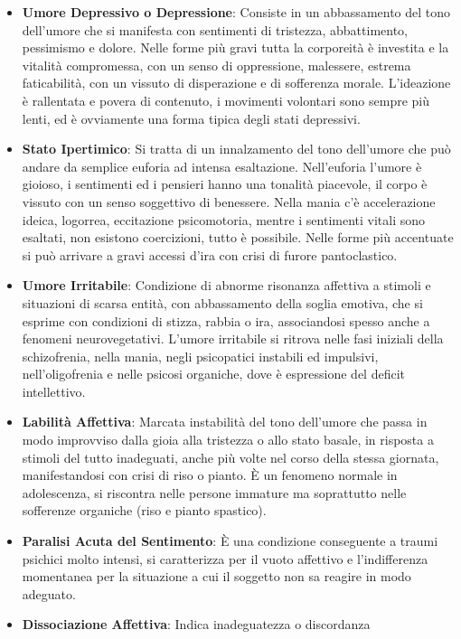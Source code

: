 \begin{itemize}
\item
  \textbf{Umore Depressivo o Depressione}: Consiste in un abbassamento
  del tono dell'umore che si manifesta con sentimenti di tristezza,
  abbattimento, pessimismo e dolore. Nelle forme più gravi tutta la
  corporeità è investita e la vitalità compromessa, con un senso di
  oppressione, malessere, estrema faticabilità, con un vissuto di
  disperazione e di sofferenza morale. L'ideazione è rallentata e povera
  di contenuto, i movimenti volontari sono sempre più lenti, ed è
  ovviamente una forma tipica degli stati depressivi.
\item
  \textbf{Stato Ipertimico}: Si tratta di un innalzamento del tono
  dell'umore che può andare da semplice euforia ad intensa esaltazione.
  Nell'euforia l'umore è gioioso, i sentimenti ed i pensieri hanno una
  tonalità piacevole, il corpo è vissuto con un senso soggettivo di
  benessere. Nella mania c'è accelerazione ideica, logorrea, eccitazione
  psicomotoria, mentre i sentimenti vitali sono esaltati, non esistono
  coercizioni, tutto è possibile. Nelle forme più accentuate si può
  arrivare a gravi accessi d'ira con crisi di furore pantoclastico.
\item
  \textbf{Umore Irritabile}: Condizione di abnorme risonanza affettiva a
  stimoli e situazioni di scarsa entità, con abbassamento della soglia
  emotiva, che si esprime con condizioni di stizza, rabbia o ira,
  associandosi spesso anche a fenomeni neurovegetativi. L'umore
  irritabile si ritrova nelle fasi iniziali della schizofrenia, nella
  mania, negli psicopatici instabili ed impulsivi, nell'oligofrenia e
  nelle psicosi organiche, dove è espressione del deficit intellettivo.
\item
  \textbf{Labilità Affettiva}: Marcata instabilità del tono dell'umore
  che passa in modo improvviso dalla gioia alla tristezza o allo stato
  basale, in risposta a stimoli del tutto inadeguati, anche più volte
  nel corso della stessa giornata, manifestandosi con crisi di riso o
  pianto. È un fenomeno normale in adolescenza, si riscontra nelle
  persone immature ma soprattutto nelle sofferenze organiche (riso e
  pianto spastico).
\item
  \textbf{Paralisi Acuta del Sentimento}: È una condizione conseguente a
  traumi psichici molto intensi, si caratterizza per il vuoto affettivo
  e l'indifferenza momentanea per la situazione a cui il soggetto non sa
  reagire in modo adeguato.
\item
  \textbf{Dissociazione Affettiva}: Indica inadeguatezza o discordanza

\end{itemize}
